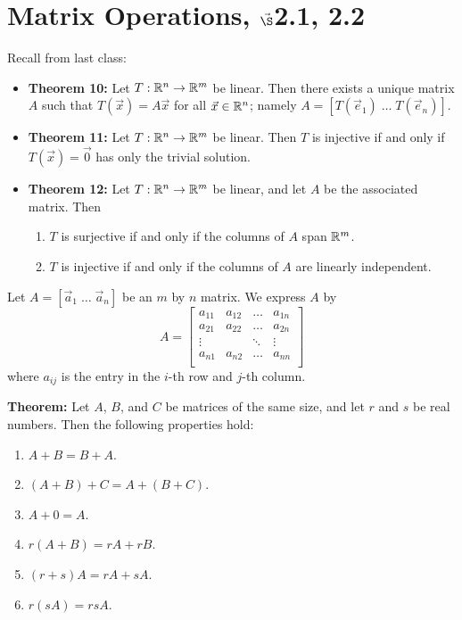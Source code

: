 


%


\section{{Matrix Operations, $\vec{\S}$2.1, 2.2}}%
% 

%
\thispagestyle{fancy}

Recall from last class:

\begin{itemize}

\item {\bf Theorem 10:} Let $T: \mathbb{R}^n \to \mathbb{R}^m$ be linear. Then there exists a unique matrix $A$ such that $T(\vec{x})=A\vec{x}$ for all $\vec{x} \in \mathbb{R}^n$; namely $A=[T(\vec{e}_1) \; \dots \; T(\vec{e}_n)]$.
\item {\bf Theorem 11:} Let $T: \mathbb{R}^n \to \mathbb{R}^m$ be linear. Then $T$ is injective if and only if $T(\vec{x})=\vec{0}$ has only the trivial solution.
\item {\bf Theorem 12:} Let $T: \mathbb{R}^n \to \mathbb{R}^m$ be linear, and let $A$ be the associated matrix. Then 
\begin{enumerate}
\item $T$ is surjective if and only if the columns of $A$ span $\mathbb{R}^m$.
\item $T$ is injective if and only if the columns of $A$ are linearly independent. 
\end{enumerate}
\end{itemize}

\newpage

Let $A=[\vec{a}_1 \; \dots \; \vec{a}_n]$ be an $m$ by $n$ matrix. We express $A$ by
$$A=\begin{bmatrix}
a_{11} & a_{12} & \hdots & a_{1n}\\ 
a_{21} & a_{22} & \hdots & a_{2n}\\ 
\vdots & & \ddots & \vdots\\
a_{n1} & a_{n2} & \hdots & a_{nn}\\ 
\end{bmatrix}$$
where $a_{ij}$ is the entry in the $i$-th row and $j$-th column.

{\bf Theorem:} Let $A$, $B$, and $C$ be matrices of the same size, and let $r$ and $s$ be real numbers. Then the following properties hold:
\begin{enumerate}
\item $A+B=B+A$.
\item $(A+B)+C=A+(B+C)$.
\item $A+0=A$.
\item $r(A+B)=rA+rB$.
\item $(r+s)A=rA+sA$.
\item $r(sA)=rsA$.
\end{enumerate}

